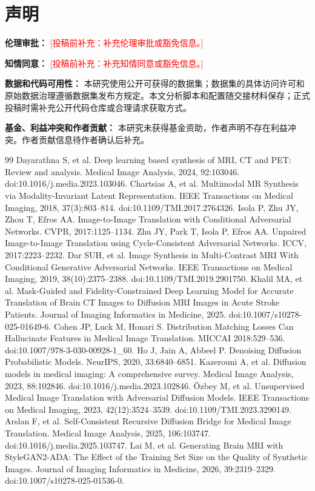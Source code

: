\documentclass[UTF8,11pt,a4paper]{ctexart}
\newcommand{\todo}[1]{\textcolor{red}{[投稿前补充：#1]}}
\begin{document}
\section*{声明}
\textbf{伦理审批：} \todo{补充伦理审批或豁免信息。}

\textbf{知情同意：} \todo{补充知情同意或豁免信息。}

\textbf{数据和代码可用性：} 本研究使用公开可获得的数据集；数据集的具体访问许可和原始数据治理遵循数据集发布方规定。本文分析脚本和配置随交接材料保存；正式投稿时需补充公开代码仓库或合理请求获取方式。

\textbf{基金、利益冲突和作者贡献：} 本研究未获得基金资助，作者声明不存在利益冲突。作者贡献信息待作者确认后补充。

\begin{thebibliography}{99}
 Dayarathna S, et al. Deep learning based synthesis of MRI, CT and PET: Review and analysis. Medical Image Analysis, 2024, 92:103046. doi:10.1016/j.media.2023.103046.
 Chartsias A, et al. Multimodal MR Synthesis via Modality-Invariant Latent Representation. IEEE Transactions on Medical Imaging, 2018, 37(3):803--814. doi:10.1109/TMI.2017.2764326.
 Isola P, Zhu JY, Zhou T, Efros AA. Image-to-Image Translation with Conditional Adversarial Networks. CVPR, 2017:1125--1134.
 Zhu JY, Park T, Isola P, Efros AA. Unpaired Image-to-Image Translation using Cycle-Consistent Adversarial Networks. ICCV, 2017:2223--2232.
 Dar SUH, et al. Image Synthesis in Multi-Contrast MRI With Conditional Generative Adversarial Networks. IEEE Transactions on Medical Imaging, 2019, 38(10):2375--2388. doi:10.1109/TMI.2019.2901750.
 Khalil MA, et al. Mask-Guided and Fidelity-Constrained Deep Learning Model for Accurate Translation of Brain CT Images to Diffusion MRI Images in Acute Stroke Patients. Journal of Imaging Informatics in Medicine, 2025. doi:10.1007/s10278-025-01649-6.
 Cohen JP, Luck M, Honari S. Distribution Matching Losses Can Hallucinate Features in Medical Image Translation. MICCAI 2018:529--536. doi:10.1007/978-3-030-00928-1\_60.
 Ho J, Jain A, Abbeel P. Denoising Diffusion Probabilistic Models. NeurIPS, 2020, 33:6840--6851.
 Kazerouni A, et al. Diffusion models in medical imaging: A comprehensive survey. Medical Image Analysis, 2023, 88:102846. doi:10.1016/j.media.2023.102846.
 Özbey M, et al. Unsupervised Medical Image Translation with Adversarial Diffusion Models. IEEE Transactions on Medical Imaging, 2023, 42(12):3524--3539. doi:10.1109/TMI.2023.3290149.
 Arslan F, et al. Self-Consistent Recursive Diffusion Bridge for Medical Image Translation. Medical Image Analysis, 2025, 106:103747. doi:10.1016/j.media.2025.103747.
 Lai M, et al. Generating Brain MRI with StyleGAN2-ADA: The Effect of the Training Set Size on the Quality of Synthetic Images. Journal of Imaging Informatics in Medicine, 2026, 39:2319--2329. doi:10.1007/s10278-025-01536-0.
\end{thebibliography}
\end{document}
